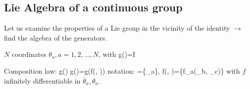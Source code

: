 \documentclass[12pt]{article}
\begin{document}
\subsection{Lie Algebra of a continuous group}

Let us examine the properties of a Lie group in the
vicinity of the identity \(\rightarrow\) find the algebra of the generators.


\(N\) coordinates \(\theta_{a}, a=1,2, \ldots, N\), with
\be
g()=I
\ee

Composition law:
\be
g(\overline{\theta}) g(\theta)=g(f(\overline{\theta}, \theta))
\ee
notation:
\be
\theta=\{\theta_{a}\}, f(\overline\theta, \theta)=\{f_{a}(\theta_{b}, \theta_{c})\}
\ee
with $f$ infinitely differentiable in $\overline{\theta}_a,\theta_a$.
\end{document}
